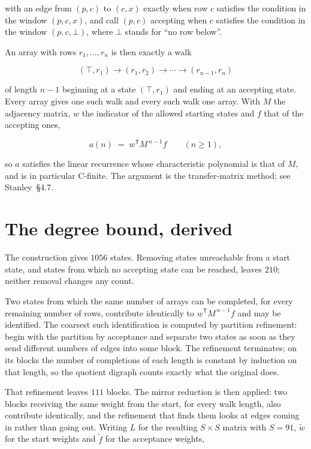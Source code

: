 \documentclass[11pt]{article}
\theoremstyle{definition}
\begin{document}
with an edge from $(p,c)$ to $(c,x)$ exactly when row $c$ satisfies the condition in the window $(p,c,x)$, and call $(p,c)$ accepting when $c$ satisfies the condition in the window $(p,c,\bot)$, where $\bot$ stands for ``no row below''.

An array with rows $r_1,\dots,r_n$ is then exactly a walk

\[(\top,r_1) \to (r_1,r_2) \to \cdots \to (r_{n-1},r_n)\]

of length $n-1$ beginning at a state $(\top,r_1)$ and ending at an accepting state. Every array gives one such walk and every such walk one array. With $M$ the adjacency matrix, $w$ the indicator of the allowed starting states and $f$ that of the accepting ones,

\[a(n) \;=\; w^{\mathsf T} M^{\,n-1} f \qquad (n \ge 1),\]

so $a$ satisfies the linear recurrence whose characteristic polynomial is that of $M$, and is in particular C-finite. The argument is the transfer-matrix method; see Stanley~\S4.7.

\section{The degree bound, derived}

The construction gives $1056$ states. Removing states unreachable from a start state, and states from which no accepting state can be reached, leaves $210$; neither removal changes any count.

Two states from which the same number of arrays can be completed, for every remaining number of rows, contribute identically to $w^{\mathsf T}M^{\,n-1}f$ and may be identified. The coarsest such identification is computed by partition refinement: begin with the partition by acceptance and separate two states as soon as they send different numbers of edges into some block. The refinement terminates; on its blocks the number of completions of each length is constant by induction on that length, so the quotient digraph counts exactly what the original does.

That refinement leaves $111$ blocks. The mirror reduction is then applied: two blocks receiving the same weight from the start, for every walk length, also contribute identically, and the refinement that finds them looks at edges coming in rather than going out. Writing $L$ for the resulting $S \times S$ matrix with $S = 91$, $\tilde w$ for the start weights and $\tilde f$ for the acceptance weights,
\end{document}
